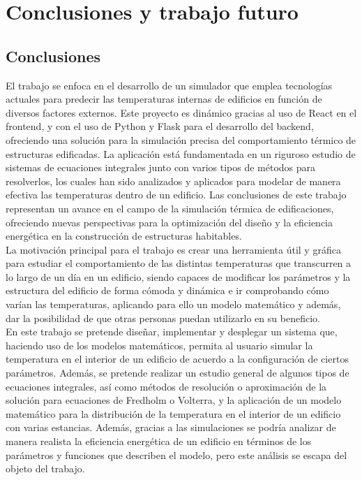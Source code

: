 \chapter{Conclusiones y trabajo futuro}
\section{Conclusiones}
El trabajo se enfoca en el desarrollo de un simulador que emplea tecnologías actuales para predecir las temperaturas internas de edificios en función de diversos factores externos. Este proyecto es dinámico gracias al uso de React en el frontend, y con el uso de Python y Flask para el desarrollo del backend, ofreciendo una solución para la simulación precisa del comportamiento térmico de estructuras edificadas. La aplicación está fundamentada en un riguroso estudio de sistemas de ecuaciones integrales junto con varios tipos de métodos para resolverlos, los cuales han sido analizados y aplicados para modelar de manera efectiva las temperaturas dentro de un edificio. Las conclusiones de este trabajo representan un avance en el campo de la simulación térmica de edificaciones, ofreciendo nuevas perspectivas para la optimización del diseño y la eficiencia energética en la construcción de estructuras habitables.\\

La motivación principal para el trabajo es crear una herramienta útil y gráfica para estudiar el comportamiento de las distintas temperaturas que transcurren a lo largo de un día en un edificio, siendo capaces de modificar los parámetros y la estructura del edificio de forma cómoda y dinámica e ir comprobando cómo varían las temperaturas,  aplicando para ello un modelo matemático y además, dar la posibilidad de que otras personas puedan utilizarlo en su beneficio.\\

En este trabajo se pretende diseñar, implementar y desplegar un sistema que, haciendo uso de los modelos matemáticos, permita al usuario simular la temperatura en el interior de un edificio de acuerdo a la configuración de ciertos parámetros. Además, se pretende realizar un estudio general de algunos tipos de ecuaciones integrales, así como métodos de resolución o aproximación de la solución para ecuaciones de Fredholm o Volterra, y la aplicación de un modelo matemático para la distribución de la temperatura en el interior de un edificio con varias estancias. Además, gracias a las simulaciones se podría analizar de manera realista la eficiencia energética de un edificio en términos de los parámetros y funciones que describen el modelo, pero este análisis se escapa del objeto del trabajo.\\

